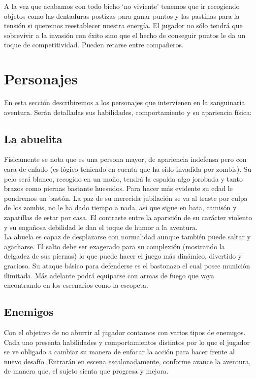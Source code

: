 \documentclass[titlepage]{article}
\begin{document}
A la vez que acabamos con todo bicho `no viviente' tenemos que ir recogiendo objetos como las dentaduras postizas para ganar puntos y las pastillas para la tensión si queremos reestablecer nuestra energía. El jugador no sólo tendrá que sobrevivir a la invasión con éxito sino que el hecho de conseguir puntos le da un toque de competitividad. Pueden retarse entre compañeros.

\section{Personajes}
En esta sección describiremos a los personajes que intervienen en la sanguinaria aventura. Serán detalladas sus habilidades, comportamiento y su apariencia física:

\subsection{La abuelita}
Físicamente se nota que es una persona mayor, de apariencia indefensa pero con cara de enfado (es lógico teniendo en cuenta que ha sido invadida por zombis). Su pelo será blanco, recogido en un moño, tendrá la espalda algo jorobada y tanto brazos como piernas bastante huesudos. Para hacer más evidente su edad le pondremos un bastón. La paz de su merecida jubilación se va al traste por culpa de los zombis, no le ha dado tiempo a nada, así que sigue en bata, camisón y zapatillas de estar por casa. El contraste entre la aparición de su carácter violento y su engañosa debilidad le dan el toque de humor a la aventura.\\

La abuela es capaz de desplazarse con normalidad aunque también puede saltar y agacharse. El salto debe ser exagerado para su complexión (mostrando la delgadez de sus piernas) lo que puede hacer el juego más dinámico, divertido y gracioso. Su ataque básico para defenderse es el bastonazo el cual posee munición ilimitada. Más adelante podrá equiparse con armas de fuego que vaya encontrando en los escenarios como la escopeta.

\subsection{Enemigos}
Con el objetivo de no aburrir al jugador contamos con varios tipos de enemigos. Cada uno presenta habilidades y comportamientos distintos por lo que el jugador se ve obligado a cambiar su manera de enfocar la acción para hacer frente al nuevo desafío. Entrarán en escena escalonadamente, conforme avance la aventura, de manera que, el sujeto sienta que progresa y mejora.
\end{document}
